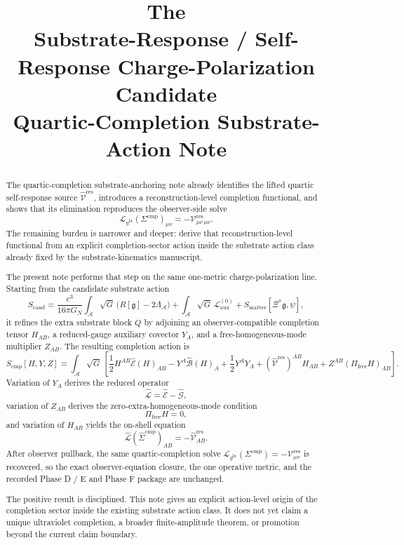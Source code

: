 \documentclass[11pt]{article}
\title{\textbf{The \TheoryName{}}\\[0.4em]
\large Substrate-Response / Self-Response Charge-Polarization Candidate\\
\large Quartic-Completion Substrate-Action Note}
\author{}
\date{}
\newcommand{\Sub}{\mathcal A}
\newcommand{\ObserverMap}{\Xi}
\newcommand{\BridgeMetric}{\mathfrak g}
\newcommand{\ObserverMetric}{g^{\mathrm{br}}}
\newcommand{\CompShift}{\Sigma^{\mathrm{cmp}}}
\newcommand{\CompLift}{\widehat\Sigma^{\mathrm{cmp}}}
\newcommand{\ResidualCore}{\mathcal V_{\mu\nu}^{\mathrm{res}}}
\newcommand{\ResidualLift}{\widehat{\mathcal V}^{\mathrm{res}}}
\newcommand{\CompAction}{S_{\mathrm{cmp}}}
\newcommand{\SubEinLin}{\widehat{\mathcal E}}
\newcommand{\SubGaugeVec}{\widehat{\mathcal B}}
\newcommand{\SubGaugeBook}{\widehat{\mathcal G}}
\newcommand{\SubReducedEin}{\widehat{\mathcal L}}
\newcommand{\FreeProj}{\Pi_{\mathrm{free}}}
\newcommand{\GaugeAux}{Y}
\newcommand{\ModeAux}{Z}
\newcommand{\ReducedEin}{\mathcal L_{\ObserverMetric}}
\newcommand{\MatterAct}{S_{\mathrm{matter}}}
\begin{document}
\maketitle

\begin{abstract}
The quartic-completion substrate-anchoring note already identifies the lifted quartic self-response source \(\ResidualLift\), introduces a reconstruction-level completion functional, and shows that its elimination reproduces the observer-side solve
\[
\ReducedEin(\CompShift)_{\mu\nu}=-\ResidualCore{}_{\mu\nu}.
\]
The remaining burden is narrower and deeper: derive that reconstruction-level functional from an explicit completion-sector action inside the substrate action class already fixed by the substrate-kinematics manuscript.

The present note performs that step on the same one-metric charge-polarization line. Starting from the candidate substrate action
\[
S_{\mathrm{cand}}
=
\frac{c^3}{16\pi G_N}\int_{\Sub}\sqrt{G}\,\bigl(R[\BridgeMetric]-2\Lambda_{\Sub}\bigr)
+\int_{\Sub}\sqrt{G}\,\mathcal L_{\mathrm{aux}}^{(0)}
+\MatterAct[\ObserverMap^*\BridgeMetric,\psi],
\]
it refines the extra substrate block \(Q\) by adjoining an observer-compatible completion tensor \(H_{AB}\), a reduced-gauge auxiliary covector \(\GaugeAux_A\), and a free-homogeneous-mode multiplier \(\ModeAux_{AB}\). The resulting completion action is
\[
\CompAction[H,\GaugeAux,\ModeAux]
=
\int_{\Sub}\sqrt{G}\,
\left[
\frac12 H^{AB}\SubEinLin(H)_{AB}
-\GaugeAux^A\SubGaugeVec(H)_A
+\frac12 \GaugeAux^A\GaugeAux_A
+(\ResidualLift)^{AB}H_{AB}
+\ModeAux^{AB}(\FreeProj H)_{AB}
\right].
\]
Variation of \(\GaugeAux_A\) derives the reduced operator
\[
\SubReducedEin=\SubEinLin-\SubGaugeBook,
\]
variation of \(\ModeAux_{AB}\) derives the zero-extra-homogeneous-mode condition
\[
\FreeProj H=0,
\]
and variation of \(H_{AB}\) yields the on-shell equation
\[
\SubReducedEin(\CompLift)_{AB}=-\ResidualLift_{AB}.
\]
After observer pullback, the same quartic-completion solve \(\ReducedEin(\CompShift)=-\ResidualCore\) is recovered, so the exact observer-equation closure, the one operative metric, and the recorded Phase D / E and Phase F package are unchanged.

The positive result is disciplined. This note gives an explicit action-level origin of the completion sector inside the existing substrate action class. It does not yet claim a unique ultraviolet completion, a broader finite-amplitude theorem, or promotion beyond the current claim boundary.
\end{abstract}
\end{document}
